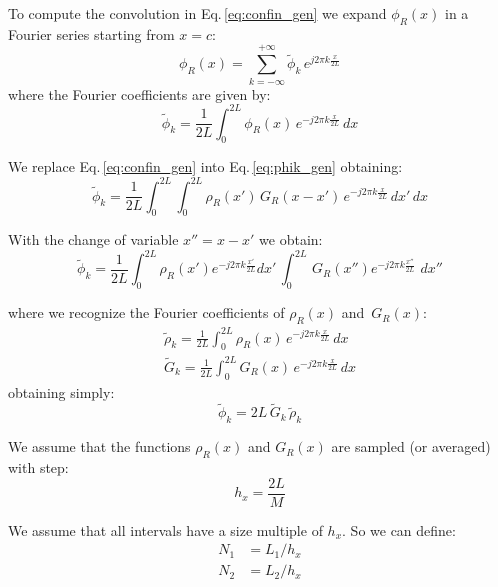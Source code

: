 To compute the convolution in Eq.\,\ref{eq:confin_gen} we expand $\phi_{R}(x)$ in a Fourier series starting from $x=c$:
\begin{equation}
\phi_{R}(x) = \sum_{k=-\infty}^{+\infty} \tilde{\phi}_k\, e^{j2\pi k \frac{x}{2L}}
\label{eq:phifour_gen}
\end{equation}
where the Fourier coefficients are given by:
\begin{equation}
\tilde{\phi}_k = \frac{1}{2L}\int_0^{2L} \phi_{R}(x)\, e^{-j2\pi k \frac{x}{2L}} \, dx
\label{eq:phik_gen}
\end{equation}

We replace Eq.\,\eqref{eq:confin_gen} into Eq.\,\eqref{eq:phik_gen} obtaining:
\begin{equation}
\tilde{\phi}_k = \frac{1}{2L}\int_0^{2L} \int_{0 }^{2L} 
\rho_{R}(x')\,G_{R}(x-x') \, e^{-j2\pi k \frac{x}{2L}} \,  dx'\, dx
\end{equation}

With the change of variable $x'' = x-x'$ we obtain:
\begin{equation}
\tilde{\phi}_k = 
\frac{1}{2L}
\int_0^{2L} 
\rho_{R}(x') e^{-j2\pi k \frac{x'}{2L}}dx'\,
\int_{0 }^{2L} 
\,G_{R}(x'') e^{-j2\pi k \frac{x''}{2L}}\,  \,  dx''
\end{equation}

where we recognize the Fourier coefficients of $\rho_{R}(x)$ and $\,G_{R}(x)$:
\begin{align}
\tilde{\rho}_k = \frac{1}{2L}\int_0^{2L} \rho_{R}(x)\, e^{-j2\pi k \frac{x}{2L}} \, dx \label{eq:rhok_gen}\\
\tilde{G}_k = \frac{1}{2L}\int_0^{2L} G_{R}(x)\, e^{-j2\pi k \frac{x}{2L}} \, dx \label{eq:Gk_gen}
\end{align}
obtaining simply:
\begin{equation}
\tilde{\phi}_k = 2L \, \tilde{G}_k \, \tilde{\rho}_k
\label{eq:freqconv_gen}
\end{equation}

We assume that the functions $\rho_{R}(x)$ and  $G_{R}(x)$ are sampled (or averaged) with step:
\begin{equation}
h_x = \frac{2L}{M}
\end{equation}

We assume that all intervals have a size multiple of $h_x$. So we can define:
\begin{align}
N_1 &= L_1 / h_x\\
N_2 &= L_2 / h_x
\end{align}

